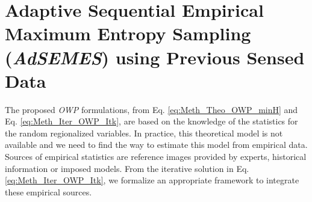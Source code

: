 

































































































\section{Adaptive Sequential Empirical Maximum Entropy Sampling (\emph{AdSEMES}) using Previous Sensed Data}
\label{sec_Meth_Marginal}

The proposed \emph{OWP} formulations, from Eq. \eqref{eq:Meth_Theo_OWP_minH} and Eq. \eqref{eq:Meth_Iter_OWP_Itk}, are based on the knowledge of the statistics for the random regionalized variables. In practice, this theoretical model is not available and we need to find the way to estimate this model from empirical data. Sources of empirical statistics are reference images provided by experts, historical information or imposed models. From the iterative solution in Eq. \eqref{eq:Meth_Iter_OWP_Itk}, we formalize an appropriate framework to integrate these empirical sources. %

